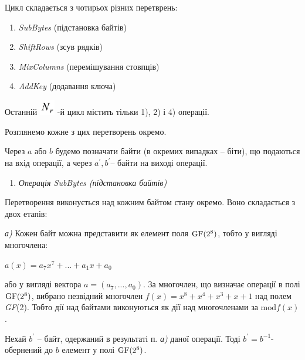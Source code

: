 \documentclass[a4paper]{article}
\newcommand\liststyleWWviiiNumiv{%
\renewcommand\theenumi{\arabic{enumi}}
\renewcommand\theenumii{\arabic{enumii}}
\renewcommand\theenumiii{\arabic{enumiii}}
\renewcommand\theenumiv{\arabic{enumiv}}
\renewcommand\labelenumi{\theenumi)}
\renewcommand\labelenumii{\theenumii.}
\renewcommand\labelenumiii{\theenumiii.}
\renewcommand\labelenumiv{\theenumiv.}
}
\newcommand\liststyleWWviiiNumxxxi{%
\renewcommand\theenumi{\arabic{enumi}}
\renewcommand\theenumii{\alph{enumii}}
\renewcommand\theenumiii{\roman{enumiii}}
\renewcommand\theenumiv{\arabic{enumiv}}
\renewcommand\labelenumi{\theenumi.}
\renewcommand\labelenumii{\theenumii.}
\renewcommand\labelenumiii{\theenumiii.}
\renewcommand\labelenumiv{\theenumiv.}
}
\newcounter{}
\newcommand\normalsubformula[1]{\text{\mathversion{normal}$#1$}}
\begin{document}
\bigskip


\bigskip

Цикл складається з чотирьох різних перетврень:

\liststyleWWviiiNumiv
\begin{enumerate}
\item \textit{SubBytes} (підстановка байтів)
\item \textit{ShiftRows} (зсув рядків)
\item \textit{MixColumns }(перемішування стовпців)
\item \textit{AddKey} (додавання ключа)
\end{enumerate}
Останній 
\includegraphics[width=0.2638in,height=0.2638in]{crypt-img/crypt-img329.png}
{}-й цикл містить тільки 1), 2) і 4) операції.

Розглянемо кожне з цих перетворень окремо. 

Через  ${a}$ або  ${b}$ будемо позначати байти (в окремих випадках – біти), що
подаються на вхід операції, а через  ${{a}^{'},{b}^{'}}$– байти на виході
операції.


\bigskip

\liststyleWWviiiNumxxxi
\begin{enumerate}
\item {\itshape
Операція SubBytes (підстановка байтів)}
\end{enumerate}

\bigskip

Перетворення виконується над кожним байтом стану окремо. Воно складається з двох
етапів:

\textit{а)} Кожен байт можна представити як елемент поля 
${\normalsubformula{\text{GF}}(2^{{8}})}$, тобто у вигляді многочлена:

{\centering 
${a(x)=a_{{7}}x^{{7}}+\text{.}\text{.}\text{.}+a_{{1}}x+a_{{0}}}$\par}

або у вигляді вектора  ${a=(a_{{7}},\text{.}\text{.}\text{.},a_{{0}})}$. За
многочлен, що визначає операції в полі 
${\normalsubformula{\text{GF}}(2^{{8}})}$, вибрано незвідний многочлен 
${f(x)=x^{{8}}+x^{{4}}+x^{{3}}+x+1}$ над полем \textit{GF}(2). Тобто  дії над
байтами виконуються як дії над многочленами за  ${\text{mod}f(x)}$.

Нехай  ${{b}^{'}}$ – байт, одержаний в результаті п. \textit{а)}  даної
операції. Тоді  ${{b}^{'}=b^{{-1}}}$\nobreakdash- обернений до  ${b}$ елемент у
полі  ${\normalsubformula{\text{GF}}(2^{{8}})}$. 
\end{document}
